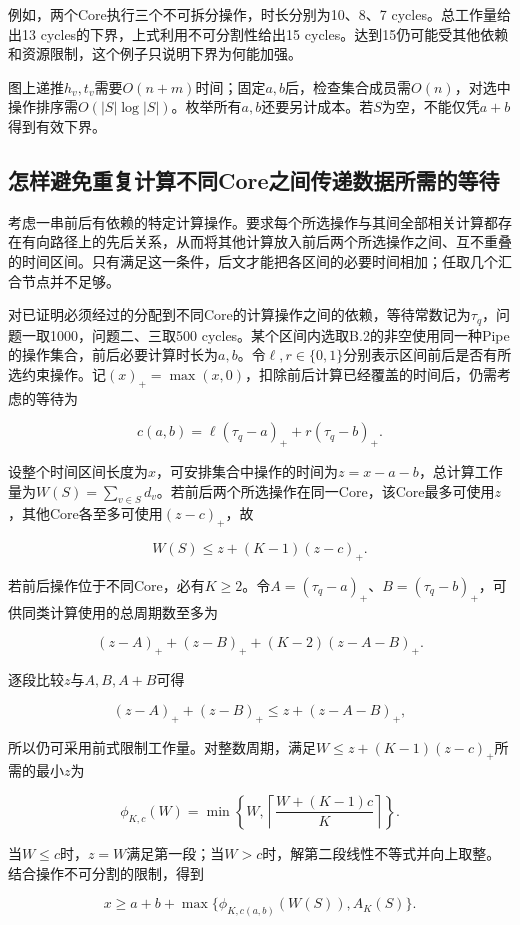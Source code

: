 \documentclass[anonymous,notoc]{gmcm2026}
\begin{document}
例如，两个Core执行三个不可拆分操作，时长分别为10、8、7 cycles。总工作量给出13 cycles的下界，上式利用不可分割性给出15 cycles。达到15仍可能受其他依赖和资源限制，这个例子只说明下界为何能加强。

图上递推\(h_v,t_v\)需要\(O(n+m)\)时间；固定\(a,b\)后，检查集合成员需\(O(n)\)，对选中操作排序需\(O(|S|\log|S|)\)。枚举所有\(a,b\)还要另计成本。若\(S\)为空，不能仅凭\(a+b\)得到有效下界。

\subsection{怎样避免重复计算不同Core之间传递数据所需的等待}

考虑一串前后有依赖的特定计算操作。要求每个所选操作与其间全部相关计算都存在有向路径上的先后关系，从而将其他计算放入前后两个所选操作之间、互不重叠的时间区间。只有满足这一条件，后文才能把各区间的必要时间相加；任取几个汇合节点并不足够。

对已证明必须经过的分配到不同Core的计算操作之间的依赖，等待常数记为\(\tau_q\)，问题一取1000，问题二、三取500 cycles。某个区间内选取B.2的非空使用同一种Pipe的操作集合，前后必要计算时长为\(a,b\)。令\(\ell,r\in\{0,1\}\)分别表示区间前后是否有所选约束操作。记\((x)_+=\max(x,0)\)，扣除前后计算已经覆盖的时间后，仍需考虑的等待为

\[c(a,b)=\ell(\tau_q-a)_++r(\tau_q-b)_+.\]

设整个时间区间长度为\(x\)，可安排集合中操作的时间为\(z=x-a-b\)，总计算工作量为\(W(S)=\sum_{v\in S}d_v\)。若前后两个所选操作在同一Core，该Core最多可使用\(z\)，其他Core各至多可使用\((z-c)_+\)，故

\[W(S)\le z+(K-1)(z-c)_+.\]

若前后操作位于不同Core，必有\(K\ge2\)。令\(A=(\tau_q-a)_+\)、\(B=(\tau_q-b)_+\)，可供同类计算使用的总周期数至多为

\[(z-A)_++(z-B)_++(K-2)(z-A-B)_+.\]

逐段比较\(z\)与\(A,B,A+B\)可得

\[(z-A)_++(z-B)_+\le z+(z-A-B)_+,\]

所以仍可采用前式限制工作量。对整数周期，满足\(W\le z+(K-1)(z-c)_+\)所需的最小\(z\)为

\[\phi_{K,c}(W)=\min\left\{W,\left\lceil\frac{W+(K-1)c}{K}\right\rceil\right\}.\]

当\(W\le c\)时，\(z=W\)满足第一段；当\(W>c\)时，解第二段线性不等式并向上取整。结合操作不可分割的限制，得到

\[x\ge a+b+\max\{\phi_{K,c(a,b)}(W(S)),A_K(S)\}.\]
\end{document}
